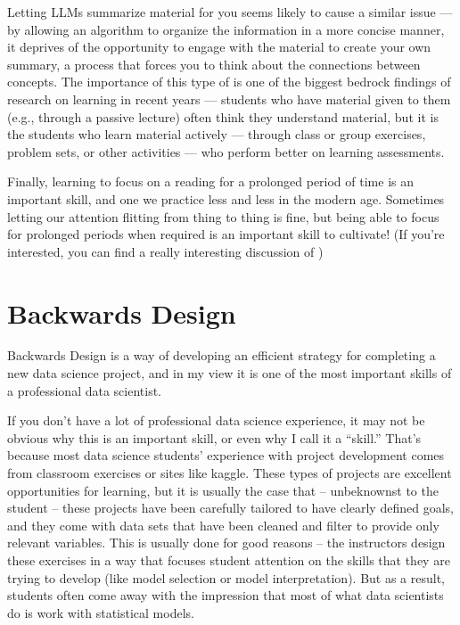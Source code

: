 \documentclass[letterpaper,10pt,english]{jupyterBook}
\begin{document}
\sphinxAtStartPar
Letting LLMs summarize material for you seems likely to cause a similar issue — by allowing an algorithm to organize the information in a more concise manner, it deprives  of the opportunity to engage with the material to create your own summary, a process that forces you to  think about the connections between concepts. The importance of this type of  is one of the biggest bedrock findings of research on learning in recent years — students who have material given to them (e.g., through a passive lecture) often think they understand material, but it is the students who learn material actively — through class or group exercises, problem sets, or other activities — who perform better on learning assessments.

\sphinxAtStartPar
Finally, learning to focus on a reading for a prolonged period of time is an important skill, and one we practice less and less in the modern age. Sometimes letting our attention flitting from thing to thing is fine, but being able to focus for prolonged periods when required is an important skill to cultivate! (If you’re interested, you can find a really interesting discussion of )

\sphinxstepscope


\chapter{Backwards Design}
\label{\detokenize{40_in_practice/05_backwards_design:backwards-design}}\label{\detokenize{40_in_practice/05_backwards_design::doc}}
\sphinxAtStartPar
Backwards Design is a way of developing an efficient strategy for completing a new data science project, and in my view it is one of the most important skills of a professional data scientist.

\sphinxAtStartPar
If you don’t have a lot of professional data science experience, it may not be obvious why this is an important skill, or even why I call it a “skill.” That’s because most data science students’ experience with project development comes from classroom exercises or sites like kaggle. These types of projects are excellent opportunities for learning, but it is usually the case that – unbeknownst to the student – these projects have been carefully tailored to have clearly defined goals, and they come with data sets that have been cleaned and filter to provide only relevant variables. This is usually done for good reasons – the instructors design these exercises in a way that focuses student attention on the skills that they are trying to develop (like model selection or model interpretation). But as a result, students often come away with the impression that most of what data scientists do is work with statistical models.
\end{document}

